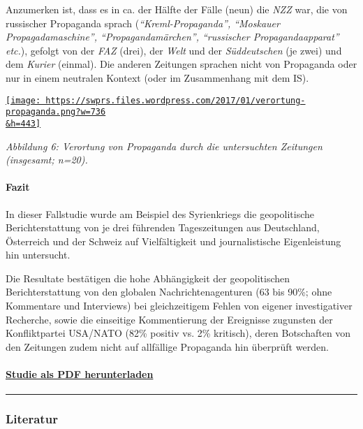 Anzumerken ist, dass es in ca. der Hälfte der Fälle (neun) die
\emph{NZZ} war, die von russischer Propaganda sprach
(\emph{``Kreml-Propaganda'', ``Moskauer Propagadamaschine'',
``Propagandamärchen'', ``russischer Propagandaapparat'' etc.}), gefolgt
von der \emph{FAZ} (drei), der \emph{Welt} und der \emph{Süddeutschen}
(je zwei) und dem \emph{Kurier} (einmal). Die anderen Zeitungen sprachen
nicht von Propaganda oder nur in einem neutralen Kontext (oder im
Zusammenhang mit dem IS).

\href{https://swprs.files.wordpress.com/2017/01/verortung-propaganda.png}{\texttt{[image: https://swprs.files.wordpress.com/2017/01/verortung-propaganda.png?w=736\\\&h=443]}}

\emph{Abbildung 6: Verortung von Propaganda durch die untersuchten
Zeitungen (insgesamt; n=20).}

\hypertarget{fazit}{%
\paragraph{Fazit}\label{fazit}}

In dieser Fallstudie wurde am Beispiel des Syrienkriegs die
geopolitische Berichterstattung von je drei führenden Tageszeitungen aus
Deutschland, Österreich und der Schweiz auf Vielfältigkeit und
journalistische Eigenleistung hin untersucht.

Die Resultate bestätigen die hohe Abhängigkeit der geopolitischen
Berichterstattung von den globalen Nachrichtenagenturen (63 bis 90\%;
ohne Kommentare und Interviews) bei gleichzeitigem Fehlen von eigener
investigativer Recherche, sowie die ein­seitige Kommentierung der
Ereig­nisse zugunsten der Konfliktpartei USA/NATO (82\% positiv vs. 2\%
kritisch), deren Botschaften von den Zeitungen zudem nicht auf
allfällige Propaganda hin überprüft werden.

\hypertarget{studie-als-pdf-herunterladen}{%
\paragraph{\texorpdfstring{\href{https://swprs.files.wordpress.com/2017/12/der-propaganda-multiplikator-2016-mt.pdf}{Studie
als PDF
herunterladen}}{Studie als PDF herunterladen}}\label{studie-als-pdf-herunterladen}}

\begin{center}\rule{0.5\linewidth}{\linethickness}\end{center}

\hypertarget{literatur}{%
\subsubsection{Literatur}\label{literatur}}

